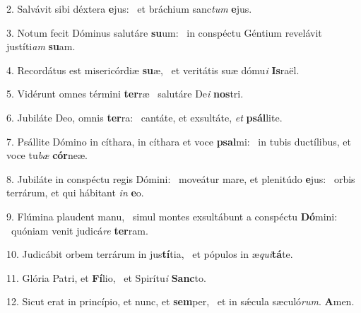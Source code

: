 2. Salvávit sibi déxtera \textbf{e}jus: \ast\  et bráchium sanc\textit{tum} \textbf{e}jus.\

3. Notum fecit Dóminus salutáre \textbf{su}um: \ast\  in conspéctu Géntium revelávit justíti\textit{am} \textbf{su}am.\

4. Recordátus est misericórdiæ \textbf{su}æ, \ast\  et veritátis suæ dómu\textit{i} \textbf{Is}raël.\

5. Vidérunt omnes términi \textbf{ter}ræ \ast\  salutáre De\textit{i} \textbf{nos}tri.\

6. Jubiláte Deo, omnis \textbf{ter}ra: \ast\  cantáte, et exsultáte, \textit{et} \textbf{psál}lite.\

7. Psállite Dómino in cíthara, in cíthara et voce \textbf{psal}mi: \ast\  in tubis ductílibus, et voce tu\textit{bæ} \textbf{cór}neæ.\

8. Jubiláte in conspéctu regis Dómini: \dag\  moveátur mare, et plenitúdo \textbf{e}jus: \ast\  orbis terrárum, et qui hábitant \textit{in} \textbf{e}o.\

9. Flúmina plaudent manu, \dag\  simul montes exsultábunt a conspéctu \textbf{Dó}mini: \ast\  quóniam venit judicá\textit{re} \textbf{ter}ram.\

10. Judicábit orbem terrárum in jus\textbf{tí}tia, \ast\  et pópulos in æ\textit{qui}\textbf{tá}te.\

11. Glória Patri, et \textbf{Fí}lio, \ast\  et Spirítu\textit{i} \textbf{Sanc}to.\

12. Sicut erat in princípio, et nunc, et \textbf{sem}per, \ast\  et in sǽcula sæculó\textit{rum}. \textbf{A}men.\

